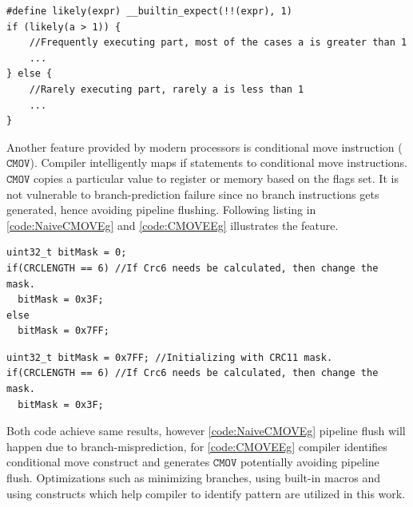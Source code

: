 \begin{code}
	\label{code:likelyHint}
\begin{verbatim}
#define likely(expr) __builtin_expect(!!(expr), 1)
if (likely(a > 1)) {
	//Frequently executing part, most of the cases a is greater than 1
	...
} else {
	//Rarely executing part, rarely a is less than 1
	...
}
\end{verbatim}
\end{code}

Another feature provided by modern processors is conditional move instruction ($\mathtt{CMOV}$). Compiler intelligently maps if statements to conditional move instructions. $\mathtt{CMOV}$ copies a particular value to register or memory based on the flags set. It is not vulnerable to branch-prediction failure since no branch instructions gets generated, hence avoiding pipeline flushing. Following listing in \ref{code:NaiveCMOVEg} and \ref{code:CMOVEEg} illustrates the feature.

\begin{code}
	\label{code:NaiveCMOVEg}
\begin{verbatim}
uint32_t bitMask = 0;
if(CRCLENGTH == 6) //If Crc6 needs be calculated, then change the mask.
  bitMask = 0x3F;
else
  bitMask = 0x7FF;
\end{verbatim}
\end{code}

\begin{code}
	\label{code:CMOVEEg}
\begin{verbatim}
uint32_t bitMask = 0x7FF; //Initializing with CRC11 mask.
if(CRCLENGTH == 6) //If Crc6 needs be calculated, then change the mask.
  bitMask = 0x3F;
\end{verbatim}
\end{code}

Both code achieve same results, however \ref{code:NaiveCMOVEg} pipeline flush will happen due to branch-misprediction, for \ref{code:CMOVEEg} compiler identifies conditional move construct and generates $\mathtt{CMOV}$ potentially avoiding pipeline flush. Optimizations such as minimizing branches, using built-in macros and using constructs which help compiler to identify pattern are utilized in this work.

